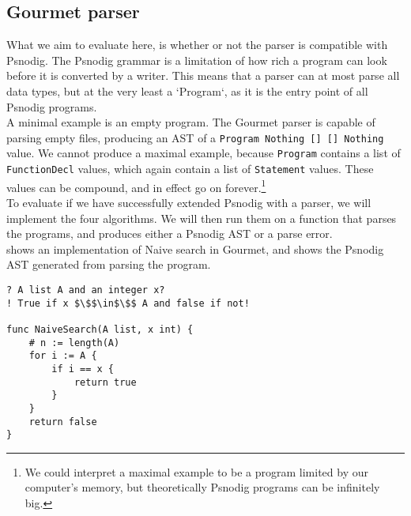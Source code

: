 \subsection{Gourmet parser}

What we aim to evaluate here, is whether or not the parser is compatible with Psnodig. The Psnodig grammar is a limitation of how rich a program can look before it is converted by a writer. This means that a parser can at most parse all data types, but at the very least a `Program`, as it is the entry point of all Psnodig programs. \\

A minimal example is an empty program. The Gourmet parser is capable of parsing empty files, producing an AST of a \texttt{Program Nothing [] [] Nothing} value. We cannot produce a maximal example, because \texttt{Program} contains a list of \texttt{FunctionDecl} values, which again contain a list of \texttt{Statement} values. These values can be compound, and in effect go on forever.\footnote{We could interpret a maximal example to be a program limited by our computer’s memory, but theoretically Psnodig programs can be infinitely big.} \\

To evaluate if we have successfully extended Psnodig with a parser, we will implement the four algorithms. We will then run them on a function that parses the programs, and produces either a Psnodig AST or a parse error. \\

 shows an implementation of Naive search in Gourmet, and  shows the Psnodig AST generated from parsing the program. \\


\begin{lstlisting}[caption={Naive search implementation in Gourmet.}, captionpos=b, label={naiveSearchGourmet}]
? A list A and an integer x?
! True if x $\$$\in$\$$ A and false if not!

func NaiveSearch(A list, x int) {
    # n := length(A)
    for i := A {
        if i == x {
            return true
        }
    }
    return false
}
\end{lstlisting}

